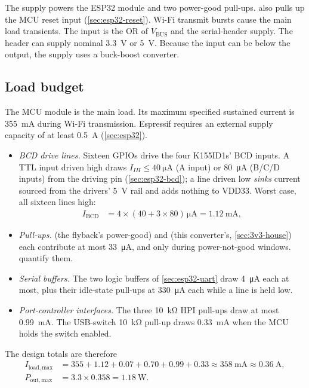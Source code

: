 The supply powers the ESP32 module and two power-good pull-ups.
 also pulls up the MCU reset input (\cref{sec:esp32-reset}). Wi-Fi
transmit bursts cause the main load transients. The input is the OR of
$V_{\mathrm{BUS}}$ and the serial-header supply. The header can supply nominal
\SI{3.3}{\volt} or \SI{5}{\volt}. Because the input can be below the output,
the supply uses a buck-boost converter.

\subsection{Load budget}\label{sec:3v3-load}

The MCU module is the main load. Its maximum specified sustained current is
\SI{355}{\milli\ampere} during Wi-Fi transmission. Espressif requires an
external supply capacity of at least \SI{0.5}{\ampere}
(\cref{sec:esp32}).

\begin{itemize}
\item \emph{BCD drive lines.} Sixteen GPIOs drive the four K155ID1s' BCD inputs. A TTL
input driven high draws $I_{IH} \leq \SI{40}{\micro\ampere}$ (A input) or
\SI{80}{\micro\ampere} (B/C/D inputs) from the driving pin (\cref{sec:esp32-bcd}); a
line driven low \emph{sinks} current sourced from the drivers' 5~V rail and adds nothing
to VDD33. Worst case, all sixteen lines high:
\begin{align*}
  I_{\mathrm{BCD}} &= 4 \times (40 + 3\times80)\,\si{\micro\ampere}
    = \SI{1.12}{\milli\ampere},
\end{align*}
\item \emph{Pull-ups.}  (the flyback's power-good) and  (this
converter's, \cref{sec:3v3-house}) each contribute at most
\SI{33}{\micro\ampere}, and only during power-not-good windows.
 quantify them.
\item \emph{Serial buffers.} The two logic buffers of \cref{sec:esp32-uart} draw
\SI{4}{\micro\ampere} each at most, plus their idle-state pull-ups at
\SI{330}{\micro\ampere} each while a line is held low.
\item \emph{Port-controller interfaces.} The three \SI{10}{\kilo\ohm} HPI
pull-ups draw at most \SI{0.99}{\milli\ampere}. The USB-switch
\SI{10}{\kilo\ohm} pull-up draws \SI{0.33}{\milli\ampere} when the MCU holds
the switch enabled.
\end{itemize}

The design totals are therefore
\begin{align*}
  I_{\mathrm{load,max}} &= 355 + 1.12 + 0.07 + 0.70 + 0.99 + 0.33
    \approx \SI{358}{\milli\ampere} \approx \SI{0.36}{\ampere},\\
  P_{\mathrm{out,max}} &= 3.3 \times 0.358 = \SI{1.18}{\watt}.
\end{align*}

